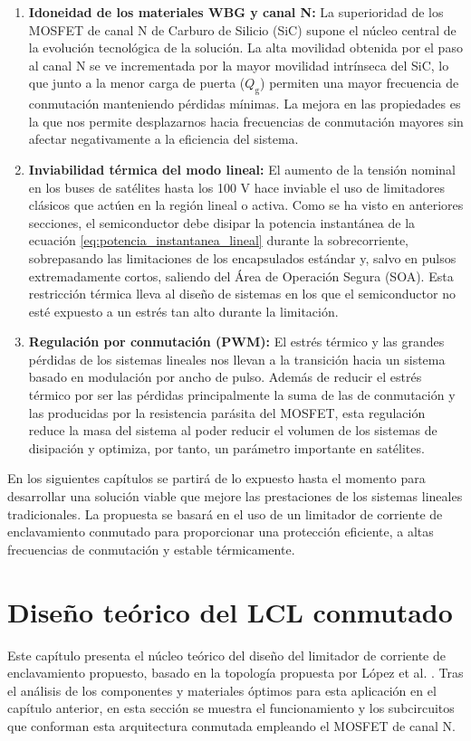 \documentclass[12pt]{report} %
\begin{document}
\begin{enumerate}
    \item \textbf{Idoneidad de los materiales WBG y canal N:} La superioridad de los MOSFET de canal N de Carburo de Silicio (SiC) supone el núcleo central de la evolución tecnológica de la solución. La alta movilidad obtenida por el paso al canal N se ve incrementada por la mayor movilidad intrínseca del SiC, lo que junto a la menor carga de puerta ($Q_\text{g}$) permiten una mayor frecuencia de conmutación manteniendo pérdidas mínimas. La mejora en las propiedades es la que nos permite desplazarnos hacia frecuencias de conmutación mayores sin afectar negativamente a la eficiencia del sistema. 
    \item \textbf{Inviabilidad térmica del modo lineal:} El aumento de la tensión nominal en los buses de satélites hasta los 100 V hace inviable el uso de limitadores clásicos que actúen en la región lineal o activa. Como se ha visto en anteriores secciones, el semiconductor debe disipar la potencia instantánea de la ecuación \ref{eq:potencia_instantanea_lineal} durante la sobrecorriente, sobrepasando las limitaciones de los encapsulados estándar y, salvo en pulsos extremadamente cortos, saliendo del Área de Operación Segura (SOA). Esta restricción térmica lleva al diseño de sistemas en los que el semiconductor no esté expuesto a un estrés tan alto durante la limitación.
    \item \textbf{Regulación por conmutación (PWM):} El estrés térmico y las grandes pérdidas de los sistemas lineales nos llevan a la transición hacia un sistema basado en modulación por ancho de pulso. Además de reducir el estrés térmico por ser las pérdidas principalmente la suma de las de conmutación y las producidas por la resistencia parásita del MOSFET, esta regulación reduce la masa del sistema al poder reducir el volumen de los sistemas de disipación y optimiza, por tanto, un parámetro importante en satélites. 
\end{enumerate}

En los siguientes capítulos se partirá de lo expuesto hasta el momento para desarrollar una solución viable que mejore las prestaciones de los sistemas lineales tradicionales. La propuesta se basará en el uso de un limitador de corriente de enclavamiento conmutado para proporcionar una protección eficiente, a altas frecuencias de conmutación y estable térmicamente.

\chapter{Diseño teórico del LCL conmutado}
\label{chapter:3Diseño}
Este capítulo presenta el núcleo teórico del diseño del limitador de corriente de enclavamiento propuesto, basado en la topología propuesta por López et al. \cite{lopez_antuna_diseno_2024}. Tras el análisis de los componentes y materiales óptimos para esta aplicación en el capítulo anterior, en esta sección se muestra el funcionamiento y los subcircuitos que conforman esta arquitectura conmutada empleando el MOSFET de canal N. 
\end{document}
